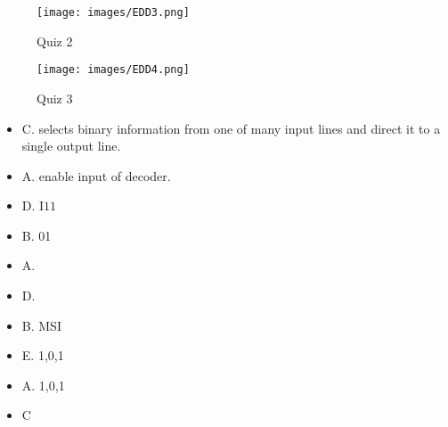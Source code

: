\documentclass[a4paper]{article}
\begin{document}
\begin{flushright}
    \begin{figure}
        \centering
        \texttt{[image: images/EDD3.png]}
        \caption{Quiz 2}
        \label{fig:enter-label}
    \end{figure}
\end{flushright}


\begin{flushright}
    \begin{figure}
        \centering
        \texttt{[image: images/EDD4.png]}
        \caption{Quiz 3}
        \label{fig:enter-label}
    \end{figure}
\end{flushright}

\newpage
\begin{itemize}
    \item C. selects binary information from one of many input lines and direct it to a single output line.
    \item A. enable input of decoder.
    \item D. I${11}$
    \item B. 01
    \item A.
    \item D.
    \item B. MSI
    \item E. 1,0,1
    \item A. 1,0,1
    \item C 
\end{itemize}
\end{document}
